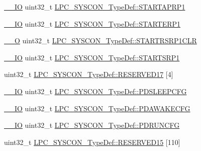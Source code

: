 \begin{DoxyCompactItemize}
\item 
\hyperlink{group___c_m_s_i_s__core__definitions_gaec43007d9998a0a0e01faede4133d6be}{\+\_\+\+\_\+\+IO} uint32\+\_\+t \hyperlink{group___l_p_c11xx___definitions_ga5396148c86ac74f5144944ff3a3c6eb9}{L\+P\+C\+\_\+\+S\+Y\+S\+C\+O\+N\+\_\+\+Type\+Def\+::\+S\+T\+A\+R\+T\+A\+P\+R\+P1}
\item 
\hyperlink{group___c_m_s_i_s__core__definitions_gaec43007d9998a0a0e01faede4133d6be}{\+\_\+\+\_\+\+IO} uint32\+\_\+t \hyperlink{group___l_p_c11xx___definitions_ga5965d7fdc0339537cc797fa8251f57d4}{L\+P\+C\+\_\+\+S\+Y\+S\+C\+O\+N\+\_\+\+Type\+Def\+::\+S\+T\+A\+R\+T\+E\+R\+P1}
\item 
\hyperlink{group___c_m_s_i_s__core__definitions_ga7e25d9380f9ef903923964322e71f2f6}{\+\_\+\+\_\+O} uint32\+\_\+t \hyperlink{group___l_p_c11xx___definitions_ga4cdc080e24dee708eae9cd43d9d9ea29}{L\+P\+C\+\_\+\+S\+Y\+S\+C\+O\+N\+\_\+\+Type\+Def\+::\+S\+T\+A\+R\+T\+R\+S\+R\+P1\+C\+LR}
\item 
\hyperlink{group___c_m_s_i_s__core__definitions_gaec43007d9998a0a0e01faede4133d6be}{\+\_\+\+\_\+\+IO} uint32\+\_\+t \hyperlink{group___l_p_c11xx___definitions_ga29fb26095e712d2e565e49ae4833ee4e}{L\+P\+C\+\_\+\+S\+Y\+S\+C\+O\+N\+\_\+\+Type\+Def\+::\+S\+T\+A\+R\+T\+S\+R\+P1}
\item 
uint32\+\_\+t \hyperlink{group___l_p_c11xx___definitions_ga0eb8d59fb969826b0b27b5527016d5f5}{L\+P\+C\+\_\+\+S\+Y\+S\+C\+O\+N\+\_\+\+Type\+Def\+::\+R\+E\+S\+E\+R\+V\+E\+D17} \mbox{[}4\mbox{]}
\item 
\hyperlink{group___c_m_s_i_s__core__definitions_gaec43007d9998a0a0e01faede4133d6be}{\+\_\+\+\_\+\+IO} uint32\+\_\+t \hyperlink{group___l_p_c11xx___definitions_ga6212507a2117dbb6d82fc184998e3c2c}{L\+P\+C\+\_\+\+S\+Y\+S\+C\+O\+N\+\_\+\+Type\+Def\+::\+P\+D\+S\+L\+E\+E\+P\+C\+FG}
\item 
\hyperlink{group___c_m_s_i_s__core__definitions_gaec43007d9998a0a0e01faede4133d6be}{\+\_\+\+\_\+\+IO} uint32\+\_\+t \hyperlink{group___l_p_c11xx___definitions_ga6b9a0f3442dd4f5a8a6bb8bc54236e62}{L\+P\+C\+\_\+\+S\+Y\+S\+C\+O\+N\+\_\+\+Type\+Def\+::\+P\+D\+A\+W\+A\+K\+E\+C\+FG}
\item 
\hyperlink{group___c_m_s_i_s__core__definitions_gaec43007d9998a0a0e01faede4133d6be}{\+\_\+\+\_\+\+IO} uint32\+\_\+t \hyperlink{group___l_p_c11xx___definitions_gaabb6707dad69fdc2c8eb0b10524902dd}{L\+P\+C\+\_\+\+S\+Y\+S\+C\+O\+N\+\_\+\+Type\+Def\+::\+P\+D\+R\+U\+N\+C\+FG}
\item 
uint32\+\_\+t \hyperlink{group___l_p_c11xx___definitions_gae7315f0a0ee0dc2a8e76d8bcd6f7d3cb}{L\+P\+C\+\_\+\+S\+Y\+S\+C\+O\+N\+\_\+\+Type\+Def\+::\+R\+E\+S\+E\+R\+V\+E\+D15} \mbox{[}110\mbox{]}

\end{DoxyCompactItemize}
